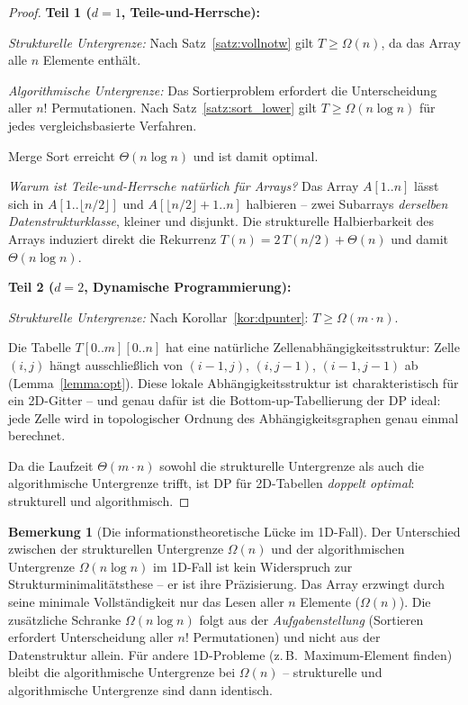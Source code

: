 ﻿\documentclass[a4paper,12pt]{article}
\theoremstyle{definition}
\newtheorem{bemerkung}{Bemerkung}
\begin{document}
\begin{proof}
    \textbf{Teil 1 ($d = 1$, Teile-und-Herrsche):}

    \emph{Strukturelle Untergrenze:} Nach Satz~\ref{satz:vollnotw} gilt
    $T \geq \Omega(n)$, da das Array alle $n$ Elemente enth\"{a}lt.

    \emph{Algorithmische Untergrenze:} Das Sortierproblem erfordert die
    Unterscheidung aller $n!$ Permutationen. Nach Satz~\ref{satz:sort_lower}
    gilt $T \geq \Omega(n \log n)$ f\"{u}r jedes vergleichsbasierte Verfahren.

    Merge Sort erreicht $\Theta(n \log n)$ und ist damit optimal.

    \emph{Warum ist Teile-und-Herrsche nat\"{u}rlich f\"{u}r Arrays?}
    Das Array $A[1..n]$ l\"{a}sst sich in $A[1..\lfloor n/2 \rfloor]$ und
    $A[\lfloor n/2 \rfloor + 1..n]$ halbieren -- zwei Subarrays
    \emph{derselben Datenstrukturklasse}, kleiner und disjunkt.
    Die strukturelle Halbierbarkeit des Arrays induziert direkt die
    Rekurrenz $T(n) = 2\,T(n/2) + \Theta(n)$ und damit $\Theta(n \log n)$.

    \textbf{Teil 2 ($d = 2$, Dynamische Programmierung):}

    \emph{Strukturelle Untergrenze:} Nach Korollar~\ref{kor:dpunter}:
    $T \geq \Omega(m \cdot n)$.

    Die Tabelle $T[0..m][0..n]$ hat eine nat\"{u}rliche
    Zellenabh\"{a}ngigkeitsstruktur: Zelle $(i, j)$ h\"{a}ngt ausschlie\ss{}lich
    von $(i-1, j)$, $(i, j-1)$, $(i-1, j-1)$ ab (Lemma~\ref{lemma:opt}).
    Diese lokale Abh\"{a}ngigkeitsstruktur ist charakteristisch f\"{u}r ein
    2D-Gitter -- und genau daf\"{u}r ist die Bottom-up-Tabellierung der DP
    ideal: jede Zelle wird in topologischer Ordnung des
    Abh\"{a}ngigkeitsgraphen genau einmal berechnet.

    Da die Laufzeit $\Theta(m \cdot n)$ sowohl die strukturelle Untergrenze
    als auch die algorithmische Untergrenze trifft, ist DP f\"{u}r
    2D-Tabellen \emph{doppelt optimal}: strukturell und algorithmisch. \qedhere
\end{proof}

\begin{bemerkung}[Die informationstheoretische L\"{u}cke im 1D-Fall]
    Der Unterschied zwischen der strukturellen Untergrenze $\Omega(n)$
    und der algorithmischen Untergrenze $\Omega(n \log n)$ im 1D-Fall
    ist kein Widerspruch zur Strukturminimalit\"{a}tsthese -- er ist ihre
    Pr\"{a}zisierung. Das Array erzwingt durch seine minimale Vollst\"{a}ndigkeit
    nur das Lesen aller $n$ Elemente ($\Omega(n)$). Die zus\"{a}tzliche
    Schranke $\Omega(n \log n)$ folgt aus der \emph{Aufgabenstellung}
    (Sortieren erfordert Unterscheidung aller $n!$ Permutationen) und
    nicht aus der Datenstruktur allein. F\"{u}r andere 1D-Probleme
    (z.\,B.\ Maximum-Element finden) bleibt die algorithmische Untergrenze
    bei $\Omega(n)$ -- strukturelle und algorithmische Untergrenze sind
    dann identisch.
\end{bemerkung}
\end{document}
